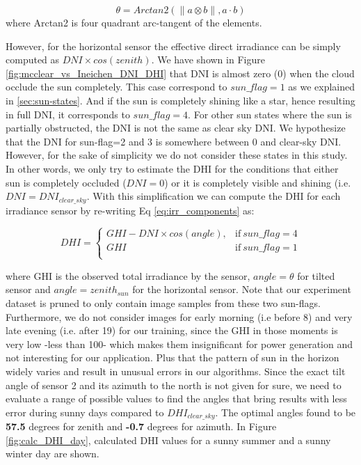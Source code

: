 \begin{equation}
\label{eq:angle_sun_tilted}
\theta = Arctan2(\| a \otimes b \|, a \cdot b)
\end{equation} 
where Arctan2 is four quadrant arc-tangent of the elements.

However, for the horizontal sensor the effective direct irradiance can be simply computed as $DNI \times cos(zenith)$. We have shown in Figure \ref{fig:mcclear_vs_Ineichen_DNI_DHI} that DNI is almost zero (0) when the cloud occlude the sun completely. This case correspond to $sun\_flag=1$ as we explained in \ref{sec:sun-states}. And if the sun is completely shining like a star, hence resulting in full DNI, it corresponds to $sun\_flag=4$. For other sun states where the sun is partially obstructed, the DNI is not the same as clear sky DNI. We hypothesize that the DNI for sun-flag=2 and 3 is somewhere between 0 and clear-sky DNI. However, for the sake of simplicity we do not consider these states in this study. In other words, we only try to estimate the DHI for the conditions that either sun is completely occluded ($DNI=0$) or it is completely visible and shining (i.e. $DNI=DNI_{clear\_sky}$. With this simplification we can compute the DHI for each irradiance sensor by re-writing Eq \ref{eq:irr_components} as:

\begin{equation}
\label{eq:DHI_eq}
DHI =
\begin{cases}
GHI - DNI \times cos (angle), & \text{if}\ sun\_flag=4 \\
GHI & \text{if}\ sun\_flag=1 \\
\end{cases}
\end{equation}

where GHI is the observed total irradiance by the sensor, $angle=\theta$ for tilted sensor and $angle=zenith_{sun}$ for the horizontal sensor. Note that our experiment dataset is pruned to only contain image samples from these two sun-flags. Furthermore, we do not consider images for early morning (i.e before 8) and very late evening (i.e. after 19) for our training, since the GHI in those moments is very low -less than 100- which makes them insignificant for power generation and not interesting for our application. Plus that the pattern of sun in the horizon widely varies and result in unusual errors in our algorithms. Since the exact tilt angle of sensor 2 and its azimuth to the north is not given for sure, we need to evaluate a range of possible values to find the angles that bring results with less error during sunny days compared to $DHI_{clear\_sky}$. The optimal angles found to be \textbf{57.5} degrees for zenith and \textbf{-0.7} degrees for azimuth. 
In Figure \ref{fig:calc_DHI_day}, calculated DHI values for a sunny summer and a sunny winter day are shown.

